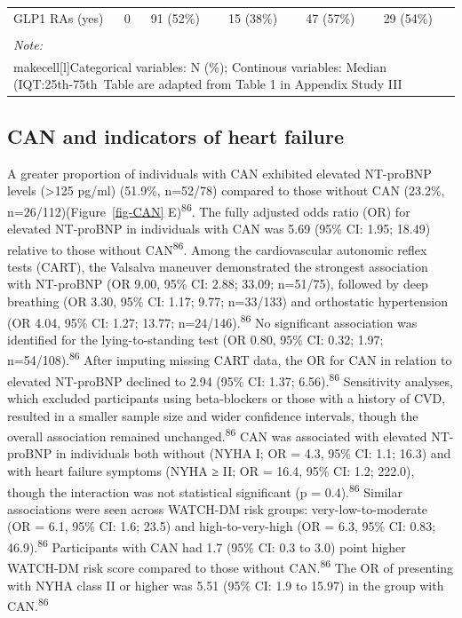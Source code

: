 \documentclass[
  letterpaper,
  headsepline=true,
  open=any]{scrbook}
\begin{document}
\begin{landscape}
\begin{table}
{\begin{tabular}[t]{llllll}
GLP1 RAs (yes) & 0 & 91 (52\%) & 15 (38\%) & 47 (57\%) & 29 (54\%)\\
\cellcolor{gray!6}{Insulin (yes)} & \cellcolor{gray!6}{0} & \cellcolor{gray!6}{140 (80\%)} & \cellcolor{gray!6}{33 (83\%)} & \cellcolor{gray!6}{66 (80\%)} & \cellcolor{gray!6}{41 (76\%)}\\
\bottomrule
\multicolumn{6}{l}{\rule{0pt}{1em}\textit{Note: }}\\
\multicolumn{6}{l}{\rule{0pt}{1em}makecell[l]{Categorical variables: N (\%); Continous variables: Median (IQT:25th-75th\ Table are adapted from Table 1 in Appendix Study III}}\\
\end{tabular}}
\endgroup{}
\end{table}
\end{landscape}

\restoregeometry

\hypertarget{can-and-indicators-of-heart-failure}{%
\subsection{CAN and indicators of heart
failure}\label{can-and-indicators-of-heart-failure}}

A greater proportion of individuals with CAN exhibited elevated
NT-proBNP levels (\textgreater125 pg/ml) (51.9\%, n=52/78) compared to
those without CAN (23.2\%, n=26/112)(Figure~\ref{fig-CAN}
E)\textsuperscript{86}. The fully adjusted odds ratio (OR) for elevated
NT-proBNP in individuals with CAN was 5.69 (95\% CI: 1.95; 18.49)
relative to those without CAN\textsuperscript{86}. Among the
cardiovascular autonomic reflex tests (CART), the Valsalva maneuver
demonstrated the strongest association with NT-proBNP (OR 9.00, 95\% CI:
2.88; 33.09; n=51/75), followed by deep breathing (OR 3.30, 95\% CI:
1.17; 9.77; n=33/133) and orthostatic hypertension (OR 4.04, 95\% CI:
1.27; 13.77; n=24/146).\textsuperscript{86} No significant association
was identified for the lying-to-standing test (OR 0.80, 95\% CI: 0.32;
1.97; n=54/108).\textsuperscript{86} After imputing missing CART data,
the OR for CAN in relation to elevated NT-proBNP declined to 2.94 (95\%
CI: 1.37; 6.56).\textsuperscript{86} Sensitivity analyses, which
excluded participants using beta-blockers or those with a history of
CVD, resulted in a smaller sample size and wider confidence intervals,
though the overall association remained unchanged.\textsuperscript{86}
CAN was associated with elevated NT-proBNP in individuals both without
(NYHA I; OR = 4.3, 95\% CI: 1.1; 16.3) and with heart failure symptoms
(NYHA ≥ II; OR = 16.4, 95\% CI: 1.2; 222.0), though the interaction was
not statistical significant (p = 0.4).\textsuperscript{86} Similar
associations were seen across WATCH-DM risk groups: very-low-to-moderate
(OR = 6.1, 95\% CI: 1.6; 23.5) and high-to-very-high (OR = 6.3, 95\% CI:
0.83; 46.9).\textsuperscript{86} Participants with CAN had 1.7 (95\% CI:
0.3 to 3.0) point higher WATCH-DM risk score compared to those without
CAN.\textsuperscript{86} The OR of presenting with NYHA class II or
higher was 5.51 (95\% CI: 1.9 to 15.97) in the group with
CAN.\textsuperscript{86}
\end{document}
